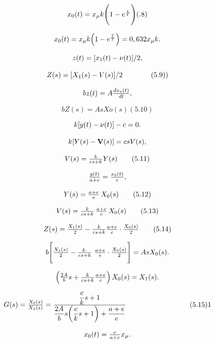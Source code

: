 \documentclass{article}
\begin{document}
\[
$$
x_{0} ( t )=x_{\mu} k \Biggl( 1-e^{\frac{t} {T}} \Biggr)
$$
(.8)
\]

\[
$$
x_{0} ( t )=x_{\mu} k \! \left( 1-e^{\frac{T} {T}} \right)=0, 6 3 2 x_{\mu} k.
$$
\]

\[
$$
z ( t )=[ x_{1} ( t )-\nu( t ) ] / 2,
$$
\]

\[
$$
Z ( s )=[ X_{1} ( s )-V ( s ) ] / 2 \qquad\qquad( 5. 9 )
$$
)
\]

\[
$$
b z ( t )=A \frac{d x_{o} ( t )} {d t},
$$
\]

\[
bZ(s)=AsXo(s) (5.10)
\]

\[
$$
k [ y ( t )-\nu( t ) ]-c=0.
$$
\]

\[
$$
k [ Y ( s )-{\bf V} ( s ) ]=c s V ( s ),
$$
\]

\[
$$
V ( s )=\frac{k} {c s+k} Y ( s ) \tag{5.11}
$$
\]

\[
$$
\frac{y ( t )} {a+e}=\frac{x_{0} ( t )} {e},
$$
\]

\[
$$
Y ( s )=\frac{a+e} {e} \, X_{0} ( s ) \tag{5.12}
$$
\]

\[
$$
V ( s )=\frac{k} {c s+k} \, \frac{a+e} {e} \, X_{0} ( s ) \tag{5.13}
$$
\]

\[
$$
Z ( s )=\frac{X_{1} ( s )} {2}-\frac{k} {c s+k} \frac{a+e} {e} \cdot\frac{X_{0} ( s )} {2} \tag{5.14}
$$
\]

\[
$$
b \Biggl[ {\frac{X_{1} ( s )} {2}}-{\frac{k \cdot} {c s+k}} \ {\frac{a+e} {e}} \cdot{\frac{X_{0} ( s )} {2}} \Biggr]=A s X_{0} ( s ).
$$
\]

\[
$$
\left( \frac{2 A} {b} s+\frac{k} {c s+k} \frac{a+e} {e} \right) X_{0} ( s )=X_{1} ( s ).
$$
\]

\[
$$
G ( s )=\frac{X_{0} ( s )} {X_{1} ( s )}=\frac{\displaystyle\frac{c} {k} s+1} {\displaystyle\frac{2 A} {b} s \bigg( \displaystyle\frac{c} {k} s+1 \bigg)+\frac{a+e} {e}} \qquad\qquad\qquad\qquad\quad( 5. 1 5 )
$$
1
\]

\[
$$
x_{0} ( t )=\frac{e} {a+e} x_{\mu}.
$$
\]
\end{document}
